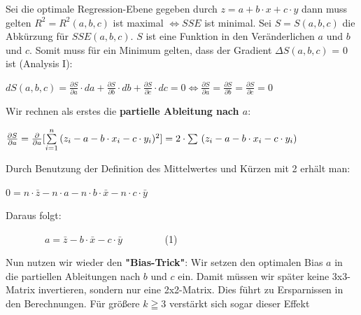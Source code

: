 \documentclass[12pt]{article}
\begin{document}
Sei die optimale Regression-Ebene gegeben durch $ z = a + b \cdot x + c \cdot y$ dann muss gelten $R^2 = R^2(a,b,c)$ ist maximal $\Leftrightarrow SSE$ ist minimal. Sei $S = S(a,b,c)$ die Abkürzung für $SSE(a,b,c)$. $S$ ist eine Funktion in den Veränderlichen $a$ und $b$ und $c$. Somit muss für ein Minimum gelten, dass der Gradient $\Delta{S(a,b,c)}$ = 0 ist (Analysis I): 
\begin{center}
\begin{large} 
$  dS(a,b,c) = \frac{\partial S}{\partial a} \cdot da + \frac{\partial S}{\partial b} \cdot db + \frac{\partial S}{\partial c} \cdot dc = 0 \Longleftrightarrow  \frac{\partial S}{\partial a} = \frac{\partial S}{\partial b} = \frac{\partial S}{\partial c} = 0 $
\end{large}
\end{center}
%
Wir rechnen als erstes die \textbf{partielle Ableitung nach $a$}:\\[0.3cm]
% 
\begin{large} 
$ \frac{\partial S}{\partial a} = \frac{\partial}{\partial a}[\sum\limits_{i=1}^n {(z_i - a - b \cdot x_i - c \cdot y_i)^2}] 
= 2 \cdot \sum\ (z_i - a - b \cdot x_i - c \cdot y_i) \\[0.5cm] $
\end{large}
%
Durch Benutzung der Definition des Mittelwertes und Kürzen mit 2 erhält man: 
%
\hspace*{3.5cm}
\begin{large}
$ 0 = n \cdot \bar{z} - n \cdot a -n \cdot b \cdot \bar{x} -n \cdot c \cdot \bar{y} $\\[0.5cm]
\end{large}
Daraus folgt: 
\begin{Large}
$ \qquad \qquad 
a = \bar{z} - b \cdot \bar{x} - c \cdot \bar{y} \qquad \qquad $ (1)\\[0.3
cm]  
\end{Large}
%
Nun nutzen wir wieder den \textbf{"Bias-Trick"}: Wir setzen den optimalen Bias $a$ in die partiellen Ableitungen nach $b$ und $c$ ein. Damit müssen wir später keine 3x3-Matrix invertieren, sondern nur eine 2x2-Matrix. Dies führt zu  Ersparnissen in den Berechnungen. Für größere $k \geqq 3$ verstärkt sich sogar dieser Effekt\\[0.4cm]
\end{document}
